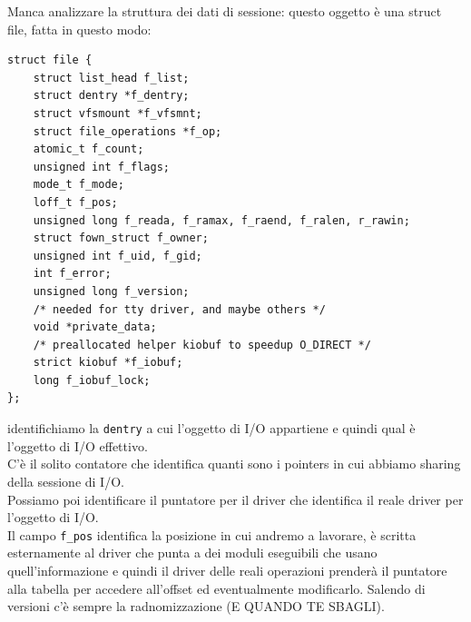 \documentclass[12pt, oneside]{extbook}
\begin{document}
Manca analizzare la struttura dei dati di sessione: questo oggetto è una struct file, fatta in questo modo:
\begin{lstlisting}
struct file {
	struct list_head f_list;
	struct dentry *f_dentry;
	struct vfsmount *f_vfsmnt;
	struct file_operations *f_op;
	atomic_t f_count;
	unsigned int f_flags;
	mode_t f_mode;
	loff_t f_pos;
	unsigned long f_reada, f_ramax, f_raend, f_ralen, r_rawin;
	struct fown_struct f_owner;
	unsigned int f_uid, f_gid;
	int f_error;
	unsigned long f_version;
	/* needed for tty driver, and maybe others */
	void *private_data;
	/* preallocated helper kiobuf to speedup O_DIRECT */
	strict kiobuf *f_iobuf;
	long f_iobuf_lock;
};
\end{lstlisting}
identifichiamo la \texttt{dentry} a cui l'oggetto di I/O appartiene e quindi qual è l'oggetto di I/O effettivo.\\C'è il solito contatore che identifica quanti sono i pointers in cui abbiamo sharing della sessione di I/O.\\Possiamo poi identificare il puntatore per il driver che identifica il reale driver per l'oggetto di I/O.\\Il campo \texttt{f\_pos} identifica la posizione in cui andremo a lavorare, è scritta esternamente al driver che punta a dei moduli eseguibili che usano quell'informazione e quindi il driver delle reali operazioni prenderà il puntatore alla tabella per accedere all'offset ed eventualmente modificarlo. Salendo di versioni c'è sempre la radnomizzazione (E QUANDO TE SBAGLI).
\end{document}
